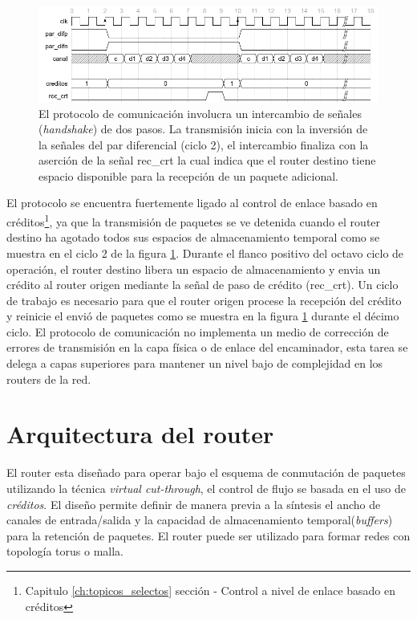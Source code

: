 \begin{figure}
	\includegraphics[width=\linewidth]{figures/ch4_w_protocolo_comunicacion.png}
	\caption
		{	
			El protocolo de comunicación involucra un intercambio de señales (\textit{handshake}) de dos pasos. La transmisión inicia con la inversión de la señales del par diferencial (ciclo 2), el intercambio finaliza con la aserción de la señal rec\_crt la cual indica que el router destino tiene espacio disponible para la recepción de un paquete adicional.
		}
	\label{fig:ch4_w_protocolo_comunicacion}
\end{figure}


El protocolo se encuentra fuertemente ligado al control de enlace basado en créditos\footnote{Capitulo \ref{ch:topicos_selectos} sección - Control a nivel de enlace basado en créditos}, ya que la transmisión de paquetes se ve detenida cuando el router destino ha agotado todos sus espacios de almacenamiento temporal como se muestra en el ciclo 2 de la figura \ref{fig:ch4_w_protocolo_comunicacion}. Durante el flanco positivo del octavo ciclo de operación, el router destino libera un espacio de almacenamiento y envia un crédito al router origen mediante la señal de paso de crédito (rec\_crt). Un ciclo de trabajo es necesario para que el router origen procese la recepción del crédito y reinicie el envió de paquetes como se muestra en la figura \ref{fig:ch4_w_protocolo_comunicacion} durante el décimo ciclo. El protocolo de comunicación no implementa un medio de corrección de errores de transmisión en la capa física o de enlace del encaminador, esta tarea se delega a capas superiores para mantener un nivel bajo de complejidad en los routers de la red.










\section{Arquitectura del router}
	\label{sec:arquitectura_router}

El router esta diseñado para operar bajo el esquema de conmutación de paquetes utilizando la técnica \textit{virtual cut-through}, el control de flujo se basada en el uso de \textit{créditos}. El diseño permite definir de manera previa a la síntesis el ancho de canales de entrada/salida y la capacidad de almacenamiento temporal(\textit{buffers}) para la retención de paquetes. El router puede ser utilizado para formar redes con topología torus o malla.  

